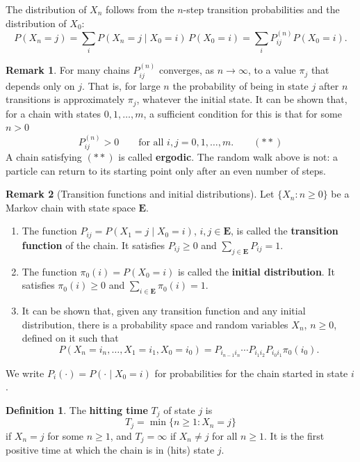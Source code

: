 \documentclass[11pt,a4paper]{article}
\theoremstyle{definition}
\newtheorem{defn}[thm]{Definition}
\newtheorem*{remark}{Remark}
\begin{document}
The distribution of $X_n$ follows from the $n$-step transition probabilities and the distribution of $X_0$:
\[
P(X_n = j) = \sum_iP(X_n = j \mid X_0 = i)\,P(X_0 = i) = \sum_iP^{(n)}_{ij}P(X_0 = i) .
\]

\begin{remark}
For many chains $P^{(n)}_{ij}$ converges, as $n \to \infty$, to a value $\pi_j$ that depends only on $j$. That is, for large $n$ the probability of being in
state $j$ after $n$ transitions is approximately $\pi_j$, whatever the initial state. It can be shown that, for a chain with states $0, 1, \dots, m$, a
sufficient condition for this is that for some $n > 0$
\[
P^{(n)}_{ij} > 0 \qquad\text{for all } i, j = 0, 1, \dots, m . \qquad (**)
\]
A chain satisfying $(**)$ is called \textbf{ergodic}. The random walk above is not: a particle can return to its starting point only after an even
number of steps.
\end{remark}

\begin{remark}[Transition functions and initial distributions]
Let $\{X_n : n \ge 0\}$ be a Markov chain with state space $\mathbf E$.
\begin{enumerate}[label=(\roman*)]
\item The function $P_{ij} = P(X_1 = j \mid X_0 = i)$, $i, j \in \mathbf E$, is called the \textbf{transition function} of the chain. It satisfies $P_{ij} \ge 0$ and
$\sum_{j\in\mathbf E}P_{ij} = 1$.
\item The function $\pi_0(i) = P(X_0 = i)$ is called the \textbf{initial distribution}. It satisfies $\pi_0(i) \ge 0$ and $\sum_{i\in\mathbf E}\pi_0(i) = 1$.
\item It can be shown that, given any transition function and any initial distribution, there is a probability space and random variables $X_n$,
$n \ge 0$, defined on it such that
\[
P(X_n = i_n, \dots, X_1 = i_1, X_0 = i_0) = P_{i_{n-1}i_n}\cdots P_{i_1i_2}P_{i_0i_1}\pi_0(i_0) .
\]
\end{enumerate}
\end{remark}

We write $P_i(\cdot) = P(\cdot \mid X_0 = i)$ for probabilities for the chain started in state $i$.

\begin{defn}
The \textbf{hitting time} $T_j$ of state $j$ is
\[
T_j = \min\{n \ge 1 : X_n = j\}
\]
if $X_n = j$ for some $n \ge 1$, and $T_j = \infty$ if $X_n \ne j$ for all $n \ge 1$. It is the first positive time at which the chain is in (hits) state $j$.
\end{defn}
\end{document}
